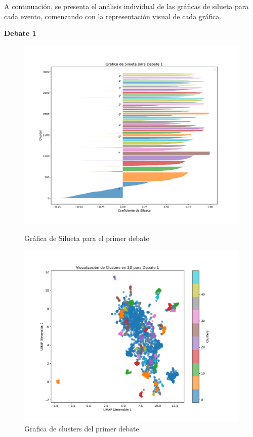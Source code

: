 \documentclass[10pt, a4paper]{article}
\begin{document}
	A continuación, se presenta el análisis individual de las gráficas de silueta para cada evento, comenzando con la representación visual de cada gráfica.
	
	\vspace{4mm}
	\textbf{Debate 1}
	\begin{figure}[h!]
		\centering
		\begin{minipage}{0.49\textwidth} %
			\includegraphics[width=\linewidth]{silhouette_debate1.pdf} 
			\caption{Gráfica de Silueta para el primer debate}
			\label{fig:silDeb1}
		\end{minipage}
		\hfill %
		\begin{minipage}{0.49\textwidth}
			\includegraphics[width=\linewidth]{clusters_debate1.pdf}
			\caption{Grafica de clusters del primer debate}
			\label{fig:clustDeb1}
		\end{minipage}
	\end{figure}
	
\end{document}
